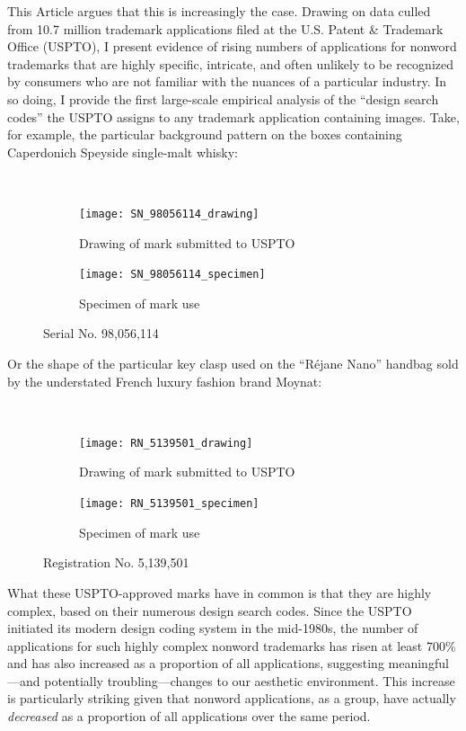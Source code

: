 \documentclass[letterpaper, 11pt, oneside]{article}
\begin{document}
This Article argues that this is increasingly the case. Drawing on data culled from 10.7 million trademark applications filed at the U.S. Patent \& Trademark Office (USPTO), I present evidence of rising numbers of applications for nonword trademarks that are highly specific, intricate, and often unlikely to be recognized by consumers who are not familiar with the nuances of a particular industry. In so doing, I provide the first large-scale empirical analysis of the ``design search codes'' the USPTO assigns to any trademark application containing images. Take, for example, the particular background pattern on the boxes containing Caperdonich Speyside single-malt whisky: \par \

\begin{figure}[H]
\centering
\begin{subfigure}[h]{0.2\linewidth}
\texttt{[image: SN\_98056114\_drawing]} \
\caption{Drawing of mark submitted to USPTO}
\end{subfigure}
\hspace{30pt}
\begin{subfigure}[h]{0.3\linewidth}
\texttt{[image: SN\_98056114\_specimen]} \
\caption{Specimen of mark use}
\end{subfigure}
\caption*{Serial No. 98,056,114}
\end{figure}
\par

\noindent Or the shape of the particular key clasp used on the ``Réjane Nano'' handbag sold by the understated French luxury fashion brand Moynat: \par \

\begin{figure}[H]
\centering
\begin{subfigure}[h]{0.4\linewidth}
\texttt{[image: RN\_5139501\_drawing]} \
\caption{Drawing of mark submitted to USPTO}
\end{subfigure}
\hspace{30pt}
\begin{subfigure}[h]{0.3\linewidth}
\texttt{[image: RN\_5139501\_specimen]} \
\caption{Specimen of mark use}
\end{subfigure}
\caption*{Registration No. 5,139,501}
\end{figure}
\par

\noindent What these USPTO-approved marks have in common is that they are highly complex, based on their numerous design search codes. Since the USPTO initiated its modern design coding system in the mid-1980s, the number of applications for such highly complex nonword trademarks has risen at least 700\% and has also increased as a proportion of all applications, suggesting meaningful—and potentially troubling—changes to our aesthetic environment. This increase is particularly striking given that nonword applications, as a group, have actually \emph{decreased} as a proportion of all applications over the same period.
\end{document}
